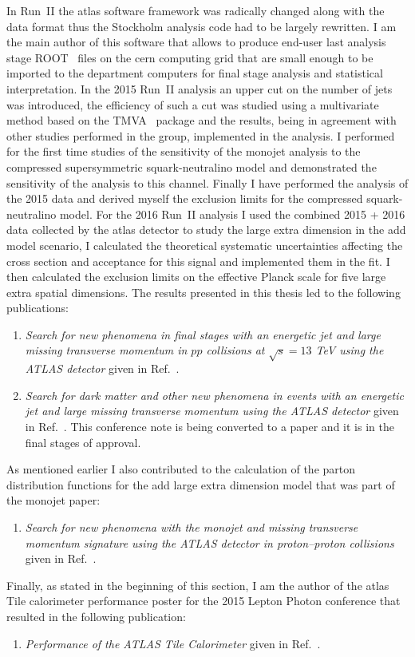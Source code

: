 In Run~II the \gls{atlas} software framework was radically changed along with
the data format thus the Stockholm analysis code had to be largely rewritten. I
am the main author of this software that allows to produce end-user last
analysis stage ROOT~\cite{CERNROOT} files on the \gls{cern} computing grid that
are small enough to be imported to the department computers for final stage
analysis and statistical interpretation. In the 2015 Run~II analysis an upper
cut on the number of jets was introduced, the efficiency of such a cut was
studied using a multivariate method based on the TMVA~\cite{TMVA} package and
the results, being in agreement with other studies performed in the group,
implemented in the analysis. I performed for the first time studies of the
sensitivity of the monojet analysis to the compressed supersymmetric
squark-neutralino model and demonstrated the sensitivity of the analysis to this
channel. Finally I have performed the analysis of the 2015 data and derived
myself the exclusion limits for the compressed squark-neutralino model. For the
2016 Run~II analysis I used the combined 2015 + 2016 data collected by the
\gls{atlas} detector to study the large extra dimension in the \gls{add} model
scenario, I calculated the theoretical systematic uncertainties affecting the
cross section and acceptance for this signal and implemented them in the fit. I
then calculated the exclusion limits on the effective Planck scale for five
large extra spatial dimensions. The results presented in this thesis led to the
following publications:
\begin{enumerate}[A -]
\item \emph{{Search for new phenomena in final stages with an energetic jet and
      large missing transverse momentum in $pp$ collisions at $\sqrt{s} = 13$
      TeV using the ATLAS detector}} given in Ref.~\cite{MonoJetPaper}.
\item \emph{{Search for dark matter and other new phenomena in events with an
      energetic jet and large missing transverse momentum using the ATLAS
      detector}} given in Ref.~\cite{MonoJetPaper2016}. This conference note is
  being converted to a paper and it is in the final stages of approval.
\end{enumerate}
As mentioned earlier I also contributed to the calculation of the parton
distribution functions for the \gls{add} large extra dimension model that was
part of the monojet paper:
\begin{enumerate}[C -]
\item \emph{Search for new phenomena with the monojet and missing transverse
    momentum signature using the ATLAS detector in proton–proton
    collisions} given in Ref.~\cite{RunIPaper}.
\end{enumerate}
Finally, as stated in the beginning of this section, I am the author of the
\gls{atlas} Tile calorimeter performance poster for the 2015 Lepton Photon
conference that resulted in the following publication:
\begin{enumerate}[D -]
\item \emph{{Performance of the ATLAS Tile Calorimeter}} given in
  Ref.~\cite{TileCalPerformanceBertoli}.
\end{enumerate}
